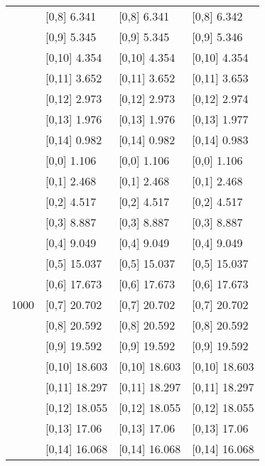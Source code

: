 \begin{table}
\begin{tabular}[t]{llll}
 & {}[0,8] 6.341 & {}[0,8] 6.341 & {}[0,8] 6.342\\
 & {}[0,9] 5.345 & {}[0,9] 5.345 & {}[0,9] 5.346\\
\addlinespace
 & {}[0,10] 4.354 & {}[0,10] 4.354 & {}[0,10] 4.354\\
 & {}[0,11] 3.652 & {}[0,11] 3.652 & {}[0,11] 3.653\\
 & {}[0,12] 2.973 & {}[0,12] 2.973 & {}[0,12] 2.974\\
 & {}[0,13] 1.976 & {}[0,13] 1.976 & {}[0,13] 1.977\\
 & {}[0,14] 0.982 & {}[0,14] 0.982 & {}[0,14] 0.983\\
\addlinespace
 & {}[0,0] 1.106 & {}[0,0] 1.106 & {}[0,0] 1.106\\
 & {}[0,1] 2.468 & {}[0,1] 2.468 & {}[0,1] 2.468\\
 & {}[0,2] 4.517 & {}[0,2] 4.517 & {}[0,2] 4.517\\
 & {}[0,3] 8.887 & {}[0,3] 8.887 & {}[0,3] 8.887\\
 & {}[0,4] 9.049 & {}[0,4] 9.049 & {}[0,4] 9.049\\
\addlinespace
 & {}[0,5] 15.037 & {}[0,5] 15.037 & {}[0,5] 15.037\\
 & {}[0,6] 17.673 & {}[0,6] 17.673 & {}[0,6] 17.673\\
1000 & {}[0,7] 20.702 & {}[0,7] 20.702 & {}[0,7] 20.702\\
 & {}[0,8] 20.592 & {}[0,8] 20.592 & {}[0,8] 20.592\\
 & {}[0,9] 19.592 & {}[0,9] 19.592 & {}[0,9] 19.592\\
\addlinespace
 & {}[0,10] 18.603 & {}[0,10] 18.603 & {}[0,10] 18.603\\
 & {}[0,11] 18.297 & {}[0,11] 18.297 & {}[0,11] 18.297\\
 & {}[0,12] 18.055 & {}[0,12] 18.055 & {}[0,12] 18.055\\
 & {}[0,13] 17.06 & {}[0,13] 17.06 & {}[0,13] 17.06\\
 & {}[0,14] 16.068 & {}[0,14] 16.068 & {}[0,14] 16.068\\
\bottomrule
\end{tabular}
\end{table}
